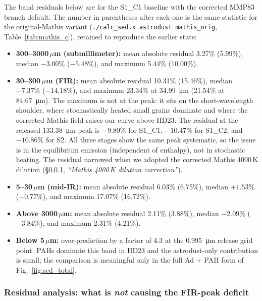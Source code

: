 \documentclass{my_memo}
\begin{document}
The band residuals below are for the S1\_C1 baseline with the
corrected MMP83 branch default. The number in parentheses after each
one is the same statistic for the original-Mathis variant
(\texttt{./calc\_sed.x astrodust mathis\_orig},
Table~\ref{tab:mathis_c}), retained to reproduce the earlier state:
\begin{itemize}
  \item \textbf{300--3000\,$\mu$m (submillimeter):} mean absolute
        residual 3.27\% (5.99\%), median $-3.00\%$ ($-5.48\%$), and
        maximum 5.44\% (10.00\%).
  \item \textbf{30--300\,$\mu$m (FIR):} mean absolute residual
        10.31\% (15.46\%), median $-7.37\%$ ($-14.18\%$), and maximum
        23.34\% at \SI{34.99}{\micro\meter} (21.54\% at
        \SI{84.67}{\micro\meter}). The maximum is not at the peak: it
        sits on the short-wavelength shoulder, where stochastically
        heated small grains dominate and where the corrected Mathis
        field raises our curve above HD23. The residual at the released
        \SI{133.38}{\micro\meter} peak is $-9.80\%$ for S1\_C1,
        $-10.47\%$ for S1\_C2, and $-10.86\%$ for S2. All three stages
        show the same peak systematic, so the issue is in the
        equilibrium emission (independent of enthalpy), not in
        stochastic heating. The residual narrowed when we adopted the
        corrected Mathis 4000\,K dilution
        (\S\ref{sec:phaseE-residual-analysis}, \emph{``Mathis 4000\,K
        dilution correction''}).
  \item \textbf{5--30\,$\mu$m (mid-IR):} mean absolute residual
        6.03\% (6.75\%), median $+1.53\%$ ($-0.77\%$), and maximum
        17.07\% (16.72\%).
  \item \textbf{Above 3000\,$\mu$m:} mean absolute residual 2.11\%
        (3.88\%), median $-2.09\%$ ($-3.84\%$), and maximum 2.31\%
        (4.21\%).
  \item \textbf{Below 5\,$\mu$m:} over-prediction by a factor of 4.3
        at the \SI{0.995}{\micro\meter} release grid point. PAHs
        dominate this band in HD23 and the astrodust-only contribution
        is small; the comparison is meaningful only in the full
        Ad + PAH form of Fig.~\ref{fig:sed_total}.
\end{itemize}

\subsubsection{Residual analysis: what is \emph{not} causing the
FIR-peak deficit}
\label{sec:phaseE-residual-analysis}
\end{document}
